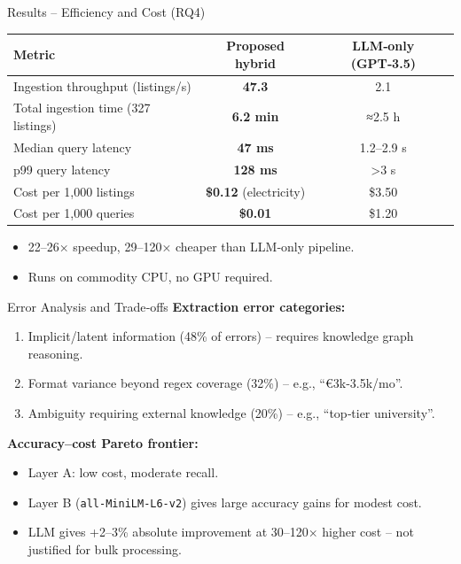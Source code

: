\documentclass[aspectratio=169, 10pt]{beamer}
\begin{document}
\begin{frame}{Results – Efficiency and Cost (RQ4)}
\begin{table}
\centering
\begin{tabular}{lcc}
\toprule
Metric & Proposed hybrid & LLM‑only (GPT‑3.5) \\
\midrule
Ingestion throughput (listings/s) & \textbf{47.3} & 2.1 \\
Total ingestion time (327 listings) & \textbf{6.2 min} & ≈2.5 h \\
Median query latency & \textbf{47 ms} & 1.2–2.9 s \\
p99 query latency & \textbf{128 ms} & >3 s \\
Cost per 1,000 listings & \textbf{\$0.12} (electricity) & \$3.50 \\
Cost per 1,000 queries & \textbf{\$0.01} & \$1.20 \\
\bottomrule
\end{tabular}
\end{table}
\begin{itemize}
\item 22–26× speedup, 29–120× cheaper than LLM‑only pipeline.
\item Runs on commodity CPU, no GPU required.
\end{itemize}
\end{frame}

\begin{frame}{Error Analysis and Trade‑offs}
\textbf{Extraction error categories:}
\begin{enumerate}
\item Implicit/latent information (48\% of errors) – requires knowledge graph reasoning.
\item Format variance beyond regex coverage (32\%) – e.g., “€3k‑3.5k/mo”.
\item Ambiguity requiring external knowledge (20\%) – e.g., “top‑tier university”.
\end{enumerate}
\vspace{0.3cm}
\textbf{Accuracy–cost Pareto frontier:}
\begin{itemize}
\item Layer A: low cost, moderate recall.
\item Layer B (\texttt{all-MiniLM-L6-v2}) gives large accuracy gains for modest cost.
\item LLM gives +2–3\% absolute improvement at 30–120× higher cost – not justified for bulk processing.
\end{itemize}
\end{frame}
\end{document}
